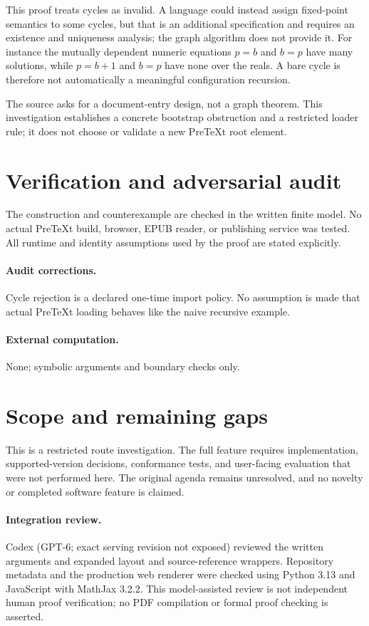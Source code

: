 \documentclass[11pt]{article}
\begin{document}
This proof treats cycles as invalid. A language could instead assign fixed-point semantics to some cycles, but that is an additional specification and requires an existence and uniqueness analysis; the graph algorithm does not provide it. For instance the mutually dependent numeric equations $p=b$ and $b=p$ have many solutions, while $p=b+1$ and $b=p$ have none over the reals. A bare cycle is therefore not automatically a meaningful configuration recursion.

The source asks for a document-entry design, not a graph theorem. This investigation establishes a concrete bootstrap obstruction and a restricted loader rule; it does not choose or validate a new PreTeXt root element.
\section{Verification and adversarial audit}
The construction and counterexample are checked in the written finite model. No actual PreTeXt build, browser, EPUB reader, or publishing service was tested. All runtime and identity assumptions used by the proof are stated explicitly.
\paragraph{Audit corrections.} Cycle rejection is a declared one-time import policy. No assumption is made that actual PreTeXt loading behaves like the naive recursive example.
\paragraph{External computation.} None; symbolic arguments and boundary checks only.
\section{Scope and remaining gaps}
This is a restricted route investigation. The full feature requires implementation, supported-version decisions, conformance tests, and user-facing evaluation that were not performed here. The original agenda remains unresolved, and no novelty or completed software feature is claimed.
\paragraph{Integration review.} Codex (GPT-6; exact serving revision not exposed) reviewed the written arguments and expanded layout and source-reference wrappers. Repository metadata and the production web renderer were checked using Python 3.13 and JavaScript with MathJax 3.2.2. This model-assisted review is not independent human proof verification; no PDF compilation or formal proof checking is asserted.
\end{document}
